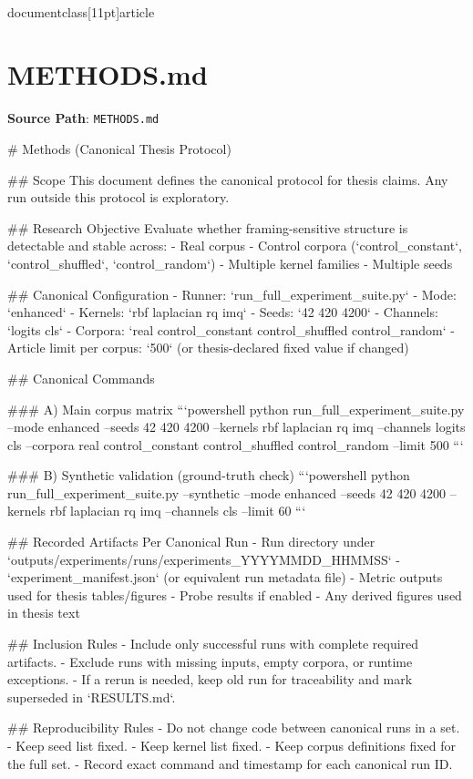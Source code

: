 \\documentclass[11pt]{article}
\begin{document}
\section*{METHODS.md}
\textbf{Source Path}: \texttt{METHODS.md}\par
\bigskip
\begin{CodeBlock}
# Methods (Canonical Thesis Protocol)

## Scope
This document defines the canonical protocol for thesis claims. Any run outside this protocol is exploratory.

## Research Objective
Evaluate whether framing-sensitive structure is detectable and stable across:
- Real corpus
- Control corpora (`control_constant`, `control_shuffled`, `control_random`)
- Multiple kernel families
- Multiple seeds

## Canonical Configuration
- Runner: `run_full_experiment_suite.py`
- Mode: `enhanced`
- Kernels: `rbf laplacian rq imq`
- Seeds: `42 420 4200`
- Channels: `logits cls`
- Corpora: `real control_constant control_shuffled control_random`
- Article limit per corpus: `500` (or thesis-declared fixed value if changed)

## Canonical Commands

### A) Main corpus matrix
```powershell
python run_full_experiment_suite.py --mode enhanced --seeds 42 420 4200 --kernels rbf laplacian rq imq --channels logits cls --corpora real control_constant control_shuffled control_random --limit 500
```

### B) Synthetic validation (ground-truth check)
```powershell
python run_full_experiment_suite.py --synthetic --mode enhanced --seeds 42 420 4200 --kernels rbf laplacian rq imq --channels cls --limit 60
```

## Recorded Artifacts Per Canonical Run
- Run directory under `outputs/experiments/runs/experiments_YYYYMMDD_HHMMSS`
- `experiment_manifest.json` (or equivalent run metadata file)
- Metric outputs used for thesis tables/figures
- Probe results if enabled
- Any derived figures used in thesis text

## Inclusion Rules
- Include only successful runs with complete required artifacts.
- Exclude runs with missing inputs, empty corpora, or runtime exceptions.
- If a rerun is needed, keep old run for traceability and mark superseded in `RESULTS.md`.

## Reproducibility Rules
- Do not change code between canonical runs in a set.
- Keep seed list fixed.
- Keep kernel list fixed.
- Keep corpus definitions fixed for the full set.
- Record exact command and timestamp for each canonical run ID.

\end{CodeBlock}
\end{document}
